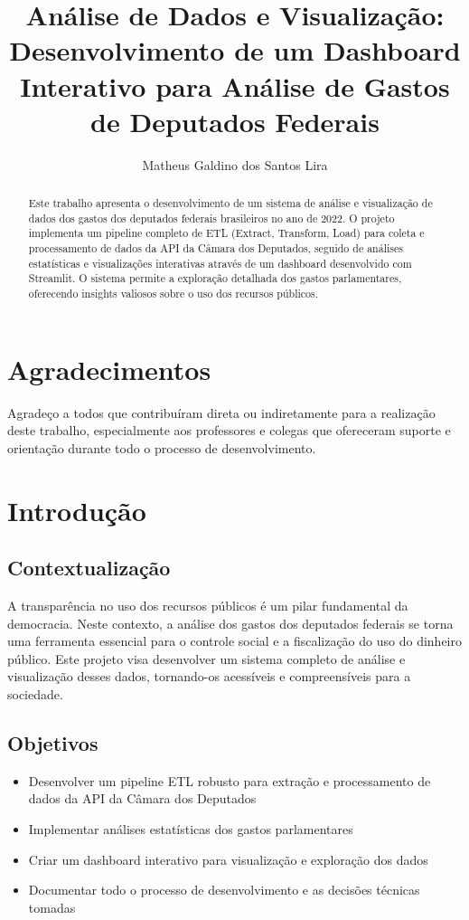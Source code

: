\documentclass[12pt,a4paper]{article}
\title{Análise de Dados e Visualização: Desenvolvimento de um Dashboard Interativo para Análise de Gastos de Deputados Federais}
\author{Matheus Galdino dos Santos Lira}
\begin{document}
\maketitle

\begin{abstract}
Este trabalho apresenta o desenvolvimento de um sistema de análise e visualização de dados dos gastos dos deputados federais brasileiros no ano de 2022. O projeto implementa um pipeline completo de ETL (Extract, Transform, Load) para coleta e processamento de dados da API da Câmara dos Deputados, seguido de análises estatísticas e visualizações interativas através de um dashboard desenvolvido com Streamlit. O sistema permite a exploração detalhada dos gastos parlamentares, oferecendo insights valiosos sobre o uso dos recursos públicos.
\end{abstract}

\tableofcontents
\listoffigures
\listoftables

\section*{Agradecimentos}
Agradeço a todos que contribuíram direta ou indiretamente para a realização deste trabalho, especialmente aos professores e colegas que ofereceram suporte e orientação durante todo o processo de desenvolvimento.

\section{Introdução}
\subsection{Contextualização}
A transparência no uso dos recursos públicos é um pilar fundamental da democracia. Neste contexto, a análise dos gastos dos deputados federais se torna uma ferramenta essencial para o controle social e a fiscalização do uso do dinheiro público. Este projeto visa desenvolver um sistema completo de análise e visualização desses dados, tornando-os acessíveis e compreensíveis para a sociedade.

\subsection{Objetivos}
\begin{itemize}
    \item Desenvolver um pipeline ETL robusto para extração e processamento de dados da API da Câmara dos Deputados
    \item Implementar análises estatísticas dos gastos parlamentares
    \item Criar um dashboard interativo para visualização e exploração dos dados
    \item Documentar todo o processo de desenvolvimento e as decisões técnicas tomadas
\end{itemize}
\end{document}
